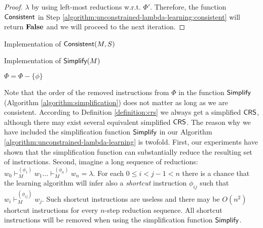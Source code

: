 \begin{proof}
$\lambda$ by using left-most reductions w.r.t. $\Phi'$. Therefore, the function $\Consistent$ in Step \ref{algorithm:unconstrained-lambda-learning:consistent} will return ${\bf False}$ and we will proceed to the next iteration.
\end{proof}

\begin{algorithm}
\caption{Implementation of $\textup{\sf Consistent}(M, S)$}
\label{algorithm:consistency}
\index{$\Consistent$}
\LinesNumbered
{}
{\;}
\;
\end{algorithm}

\begin{algorithm}
\caption{Implementation of $\textup{\sf Simplify}(M)$}
\label{algorithm:simplification}
\index{$\Simplify$}
\LinesNumbered
{}
{$\Phi = \Phi - \{\phi\}$}
\Return{$(\Sigma, \Phi)$}\;
\end{algorithm}

Note that the order of the removed instructions from $\Phi$ in the function $\Simplify$ (Algorithm \ref{algorithm:simplification}) does not matter as long as we are consistent. According to Definition \ref{definition:crs} we always get a simplified $\textup{\sf CRS\/}$, although there may exist several equivalent simplified $\textup{\sf CRS\/}$. The reason why we have included the simplification function $\Simplify$ in our Algorithm \ref{algorithm:unconstrained-lambda-learning} is twofold. First, our experiments have shown that the simplification function can substantially reduce the resulting set of instructions. Second, imagine a long sequence of reductions: $w_0 \vdash_M^{(\phi_1)} w_1 \ldots \vdash_M^{(\phi_n)} w_n = \lambda$. For each $0 \le i < j - 1 < n$ there is a chance that the learning algorithm will infer also a \emph{shortcut} instruction $\phi_{ij}$ such that $w_i \vdash_M^{(\phi_{ij})} w_j$. Such shortcut instructions are useless and there may be $O(n^2)$ shortcut instructions for every $n$-step reduction sequence. All shortcut instructions will be removed when using the simplification function $\Simplify$.

